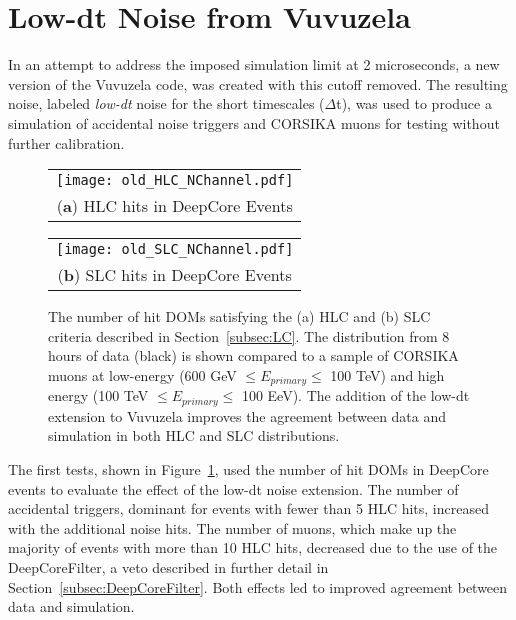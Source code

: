\label{sec:lowdt_vuvuzela}
\section{Low-dt Noise from Vuvuzela}
In an attempt to address the imposed simulation limit at 2 microseconds, a new version of the Vuvuzela code, was created with this cutoff removed.
The resulting noise, labeled \emph{low-dt} noise for the short timescales ($\Delta$t), was used to produce a simulation of accidental noise triggers and CORSIKA muons for testing without further calibration.

\begin{figure}[h]
\centering
\begin{tabular}[b]{c}
  \texttt{[image: old\_HLC\_NChannel.pdf]} \\
  \small (\textbf{\color{ctcolormain}a}) HLC hits in DeepCore Events
\end{tabular} \hspace{2pt}
\begin{tabular}[b]{c}
  \texttt{[image: old\_SLC\_NChannel.pdf]} \\
  \small (\textbf{\color{ctcolormain}b}) SLC hits in DeepCore Events
\end{tabular}
\caption{The number of hit DOMs satisfying the (a) HLC and (b) SLC criteria described in Section~\ref{subsec:LC}. The distribution from 8 hours of data (black) is shown compared to a sample of CORSIKA muons at low-energy (600 GeV $\leq E_{primary} \leq$ 100 TeV) and high energy (100 TeV $\leq E_{primary} \leq$ 100 EeV). The addition of the low-dt extension to Vuvuzela improves the agreement between data and simulation in both HLC and SLC distributions.}
\label{fig:uncalibrated_nchannel}
\end{figure}

The first tests, shown in Figure~\ref{fig:uncalibrated_nchannel}, used the number of hit DOMs in DeepCore events to evaluate the effect of the low-dt noise extension.
The number of accidental triggers, dominant for events with fewer than 5 HLC hits, increased with the additional noise hits.
The number of muons, which make up the majority of events with more than 10 HLC hits, decreased due to the use of the DeepCoreFilter, a veto described in further detail in Section~\ref{subsec:DeepCoreFilter}.
Both effects led to improved agreement between data and simulation.

